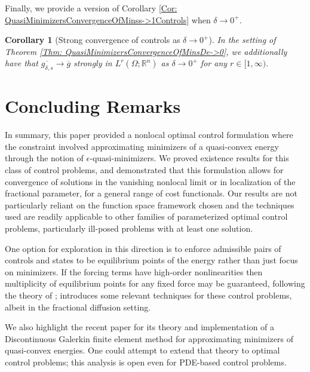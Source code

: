 \documentclass[11pt, reqno]{amsart}   	%
\theoremstyle{plain}
\numberwithin{equation}{section}
\newtheorem{corollary}[thm]{Corollary}
\newtheorem{remark}[thm]{Remark}
\def\de{\delta}
\def\ep{\epsilon}
\def\Ga{\Gamma}
\def\Om{\Omega}
\def\R{\mathbb{R}}
\begin{document}
 Finally, we provide a version of Corollary \ref{Cor: QuasiMinimizersConvergenceOfMinss->1Controls} when $\de \rightarrow 0^+$.

 \begin{corollary}[Strong convergence of controls as $\de \rightarrow 0^+$]\label{Cor: QuasiMinimizersConvergenceOfMinsde->0Controls}
    In the setting of Theorem \ref{Thm: QuasiMinimizersConvergenceOfMinsDe->0}, we additionally have that $\overline{g_{\de, s}} \rightarrow \overline{g}$ strongly in $L^r(\Om; \R^n)$ as $\de \rightarrow 0^+$ for any $r \in [1, \infty)$.
\end{corollary}



\section{Concluding Remarks}\label{Sec: Conclusion}

In summary, this paper provided a nonlocal optimal control formulation where the constraint involved approximating minimizers of a quasi-convex energy through the notion of $\ep$-quasi-minimizers. We proved existence results for this class of control problems, and demonstrated that this formulation allows for convergence of solutions in the vanishing nonlocal limit or in localization of the fractional parameter, for a general range of cost functionals. Our results are not particularly reliant on the function space framework chosen and the techniques used are readily applicable to other families of parameterized optimal control problems, particularly ill-posed problems with at least one solution.

 One option for exploration in this direction is to enforce admissible pairs of controls and states to be equilibrium points of the energy rather than just focus on minimizers. If the forcing terms have high-order nonlinearities then multiplicity of equilibrium points for any fixed force may be guaranteed, following the theory of \cite{torres2017existence, servadei2012mountain, servadei2013variational}; \cite{siktar2024superlinear} introduces some relevant techniques for these control problems, albeit in the fractional diffusion setting.

We also highlight the recent paper \cite{grekas2025convergence} for its theory and implementation of a Discontinuous Galerkin finite element method for approximating minimizers of quasi-convex energies. One could attempt to extend that theory to optimal control problems; this analysis is open even for PDE-based control problems.

\end{document}
